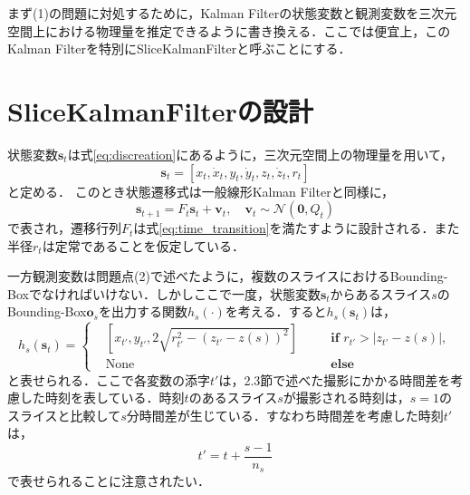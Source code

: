 まず(1)の問題に対処するために，Kalman Filterの状態変数と観測変数を三次元空間上における物理量を推定できるように書き換える．ここでは便宜上，このKalman Filterを特別にSliceKalmanFilterと呼ぶことにする．
    
\section{SliceKalmanFilterの設計}
状態変数$\bm{s}_t$は式\ref{eq:discreation}にあるように，三次元空間上の物理量を用いて，
\begin{equation}
    \label{eq:skf_state}
    \bm{s}_t = \left[x_t, \dot{x}_t, y_t, \dot{y}_t, z_t, \dot{z}_t, r_t\right]
\end{equation}
と定める．
このとき状態遷移式は一般線形Kalman Filterと同様に，
\begin{equation}
    \bm{s}_{t+1} = F_t \bm{s}_t + \bm{v}_t,\quad \bm{v}_t \sim \mathcal{N}(\bm{0}, Q_t)
\end{equation}
で表され，遷移行列$F_t$は式\ref{eq:time_transition}を満たすように設計される．また半径$r_t$は定常であることを仮定している．
\par
一方観測変数は問題点(2)で述べたように，複数のスライスにおけるBounding-Boxでなければいけない．しかしここで一度，状態変数$\bm{s}_t$からあるスライス$s$のBounding-Box$\bm{o}_s$を出力する関数$h_s(\cdot)$を考える．すると$h_s(\bm{s}_t)$は，
\begin{equation}
    \label{eq:single_map}
    h_s(\bm{s}_t) = \left\{
        \begin{aligned}
            &\left[x_{t'}, y_{t'}, 2\sqrt{r_{t'}^2 - \left(z_{t'} - z(s)\right)^2} \right]& &\quad \textbf{if }r_{t'} > \left| z_{t'} - z(s) \right|,
            \\ &\text{None}& &\quad \textbf{else }
        \end{aligned}
    \right.
\end{equation}
と表せられる．ここで各変数の添字$t'$は，2.3節で述べた撮影にかかる時間差を考慮した時刻を表している．時刻$t$のあるスライス$s$が撮影される時刻は，$s=1$のスライスと比較して$s$分時間差が生じている．すなわち時間差を考慮した時刻$t'$は，
\begin{equation}
    \label{eq:time_with_lag}
    t' = t + \frac{s-1}{n_s}
\end{equation}
で表せられることに注意されたい．

